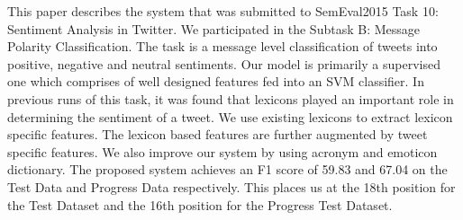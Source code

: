 This paper describes the system that was submitted to SemEval2015 Task 10: Sentiment Analysis in Twitter. We participated in the Subtask B: Message Polarity Classification. The task is a message level classification of tweets into positive, negative and neutral sentiments. Our model is primarily a supervised one which comprises of well designed features fed into an SVM classifier. In previous runs of this task, it was found that lexicons played an important role in determining the sentiment of a tweet. We use existing lexicons to extract lexicon specific features. The lexicon based features are further augmented by tweet specific features. We also improve our system by using acronym and emoticon dictionary. The proposed system achieves an F1 score of 59.83 and 67.04 on the Test Data and Progress Data respectively. This places us at the 18th position for the Test Dataset and the 16th position for the Progress Test Dataset.
